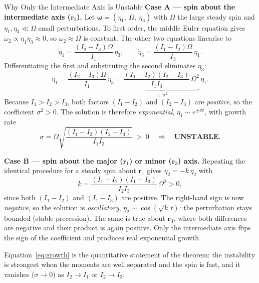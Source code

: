 \documentclass[11pt,letterpaper]{article}
\begin{document}
\begin{equationbreakdown}{Why Only the Intermediate Axis Is Unstable}
\textbf{Case A --- spin about the intermediate axis ($\mathbf{r}_2$).}
Let $\boldsymbol{\omega} = (\eta_1,\ \Omega,\ \eta_3)$ with
$\Omega$ the large steady spin and $\eta_1,\eta_3 \ll \Omega$ small
perturbations. To first order, the middle Euler equation gives
$\dot\omega_2 \propto \eta_1\eta_3 \approx 0$, so $\omega_2 \approx \Omega$ is
constant. The other two equations linearise to
\begin{equation*}
\dot\eta_1 = \frac{(I_2-I_3)\Omega}{I_1}\,\eta_3, \qquad
\dot\eta_3 = \frac{(I_1-I_2)\Omega}{I_3}\,\eta_1 .
\end{equation*}
Differentiating the first and substituting the second eliminates $\eta_3$:
\begin{equation*}
\ddot\eta_1 = \frac{(I_2-I_3)\Omega}{I_1}\,\dot\eta_3
= \underbrace{\frac{(I_1-I_2)(I_2-I_3)}{I_1 I_3}\,\Omega^2}_{\equiv\ \sigma^2}\,\eta_1 .
\end{equation*}
Because $I_1 > I_2 > I_3$, both factors $(I_1-I_2)$ and $(I_2-I_3)$ are
\emph{positive}, so the coefficient $\sigma^2 > 0$. The solution is therefore
\emph{exponential}, $\eta_1 \sim e^{\pm\sigma t}$, with growth rate
\begin{equation}\label{eq:growth}
\sigma = \Omega\sqrt{\frac{(I_1-I_2)(I_2-I_3)}{I_1 I_3}} \;>\; 0
\quad\Longrightarrow\quad \textbf{UNSTABLE}.
\end{equation}

\textbf{Case B --- spin about the major ($\mathbf{r}_1$) or minor
($\mathbf{r}_3$) axis.} Repeating the identical procedure for a steady spin
about $\mathbf{r}_1$ gives $\ddot\eta_2 = -k\,\eta_2$ with
\begin{equation*}
k = \frac{(I_1-I_2)(I_1-I_3)}{I_2 I_3}\,\Omega^2 > 0 ,
\end{equation*}
since both $(I_1-I_2)$ and $(I_1-I_3)$ are positive. The right-hand sign is now
\emph{negative}, so the solution is \emph{oscillatory},
$\eta_2 \sim \cos(\sqrt{k}\,t)$: the perturbation stays bounded (stable
precession). The same is true about $\mathbf{r}_3$, where both differences are
negative and their product is again positive. Only the intermediate axis flips
the sign of the coefficient and produces real exponential growth.
\end{equationbreakdown}

\noindent Equation~\eqref{eq:growth} is the quantitative statement of the
theorem: the instability is strongest when the moments are well separated and
the spin is fast, and it vanishes ($\sigma \to 0$) as $I_2 \to I_1$ or
$I_2 \to I_3$.
\end{document}
